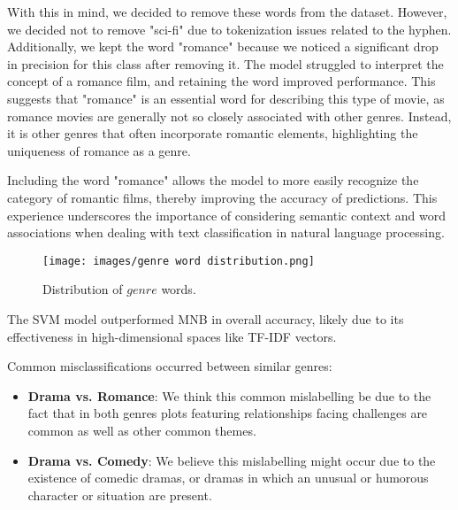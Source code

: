 \documentclass[3pt, sigconf, nonacm]{acmart}
\begin{document}
With this in mind, we decided to remove these words from the dataset. However, we decided not to remove "sci-fi" due to tokenization issues related to the hyphen. Additionally, we kept the word "romance" because we noticed a significant drop in precision for this class after removing it. The model struggled to interpret the concept of a romance film, and retaining the word improved performance. This suggests that "romance" is an essential word for describing this type of movie, as romance movies are generally not so closely associated with other genres. Instead, it is other genres that often incorporate romantic elements, highlighting the uniqueness of romance as a genre.

Including the word "romance" allows the model to more easily recognize the category of romantic films, thereby improving the accuracy of predictions. This experience underscores the importance of considering semantic context and word associations when dealing with text classification in natural language processing.






\begin{figure}
    \centering
    \texttt{[image: images/genre word distribution.png]}
    \caption{\footnotesize Distribution of $genre$ words.}
    \Description{~}
    \label{fig:genre word distribution}
\end{figure}

The SVM model outperformed MNB in overall accuracy, likely due to its effectiveness in high-dimensional spaces like TF-IDF vectors.


Common misclassifications occurred between similar genres:

\begin{itemize}
    \item \textbf{Drama vs. Romance}: We think this common mislabelling be due to the fact that in both genres plots featuring relationships facing challenges are common as well as other common themes.
    \item \textbf{Drama vs. Comedy}: We believe this mislabelling might occur due to the existence of comedic dramas, or dramas in which an unusual or humorous character or situation are present.
\end{itemize}
\end{document}

